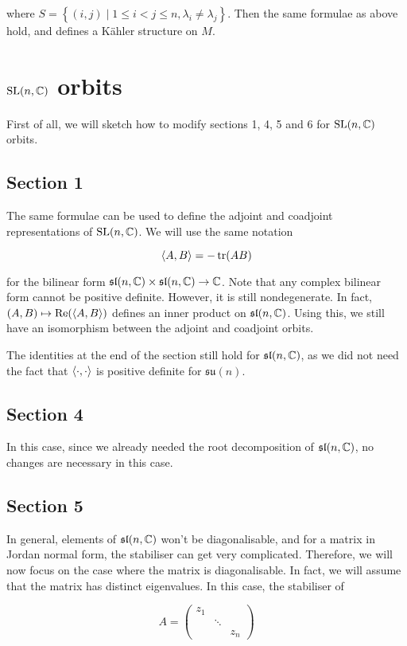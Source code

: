 \documentclass{article}
\newcommand{\su}{\mathfrak{su}}
\renewcommand{\sl}{\mathfrak{sl}}
\begin{document}
where \(S = \left\{(i, j) \mid 1 \le i < j \le n, \lambda_i \ne \lambda_j\right\}\). Then the same formulae as above hold, and defines a K\"ahler structure on \(M\). 

\section{\(\operatorname{SL}(n, \mathbb{C})\) orbits}

First of all, we will sketch how to modify sections 1, 4, 5 and 6 for \(\operatorname{SL}(n, \mathbb{C})\) orbits.

\subsection*{Section 1}

The same formulae can be used to define the adjoint and coadjoint representations of \(\operatorname{SL}(n, \mathbb{C})\). We will use the same notation

\[\left\langle A, B \right\rangle = -\tr(AB)\]

for the bilinear form \(\sl(n, \C) \times \sl(n, \C) \to \C\). Note that any complex bilinear form cannot be positive definite. However, it is still nondegenerate. In fact, \((A, B) \mapsto \Re(\left\langle A, B \right\rangle)\) defines an inner product on \(\sl(n, \C)\). Using this, we still have an isomorphism between the adjoint and coadjoint orbits.

The identities at the end of the section still hold for \(\sl(n, \C)\), as we did not need the fact that \(\left\langle \cdot, \cdot \right\rangle\) is positive definite for \(\su(n)\).

\subsection*{Section 4}

In this case, since we already needed the root decomposition of \(\sl(n, \C)\), no changes are necessary in this case.

\subsection*{Section 5}

In general, elements of \(\sl(n, \C)\) won't be diagonalisable, and for a matrix in Jordan normal form, the stabiliser can get very complicated. Therefore, we will now focus on the case where the matrix is diagonalisable. In fact, we will assume that the matrix has distinct eigenvalues. In this case, the stabiliser of

\[A = \begin{pmatrix}
    z_1 \\
    & \ddots \\
    & & z_n
\end{pmatrix}\]
\end{document}
